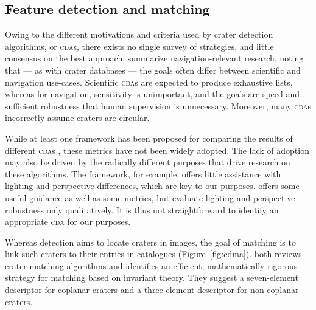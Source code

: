 \documentclass[12pt]{article}
\begin{document}
\subsection{Feature detection and matching}
Owing to the different motivations and criteria used by crater detection algorithms, or \textsc{cda}s, there exists no single survey of strategies, and little consensus on the best approach. \citet{Christian2020} summarize navigation-relevant research, noting that --- as with crater databases --- the goals often differ between scientific and navigation use-cases. Scientific \textsc{cda}s are expected to produce exhaustive lists, whereas for navigation, sensitivity is unimportant, and the goals are speed and sufficient robustness that human supervision is unnecessary. Moreover, many \textsc{cda}s incorrectly assume craters are circular.

While at least one framework has been proposed for comparing the results of different \textsc{cda}s \citep{Salamuniccar2008}, these metrics have not been widely adopted. The lack of adoption may also be driven by the radically different purposes that drive research on these algorithms. The \citet{Salamuniccar2008} framework, for example, offers little assistance with lighting and perspective differences, which are key to our purposes. \citet{Woicke2018} offers some useful guidance as well as some metrics, but evaluate lighting and perspective robustness only qualitatively. It is thus not straightforward to identify an appropriate \textsc{cda} for our purposes.

Whereas detection aims to locate craters in images, the goal of matching is to link such craters to their entries in catalogues (Figure~\ref{fig:cdma}). \citet{Christian2020} both reviews crater matching algorithms and identifies an efficient, mathematically rigorous strategy for matching based on invariant theory. They suggest a seven-element descriptor for coplanar craters and a three-element descriptor for non-coplanar craters.
\end{document}
